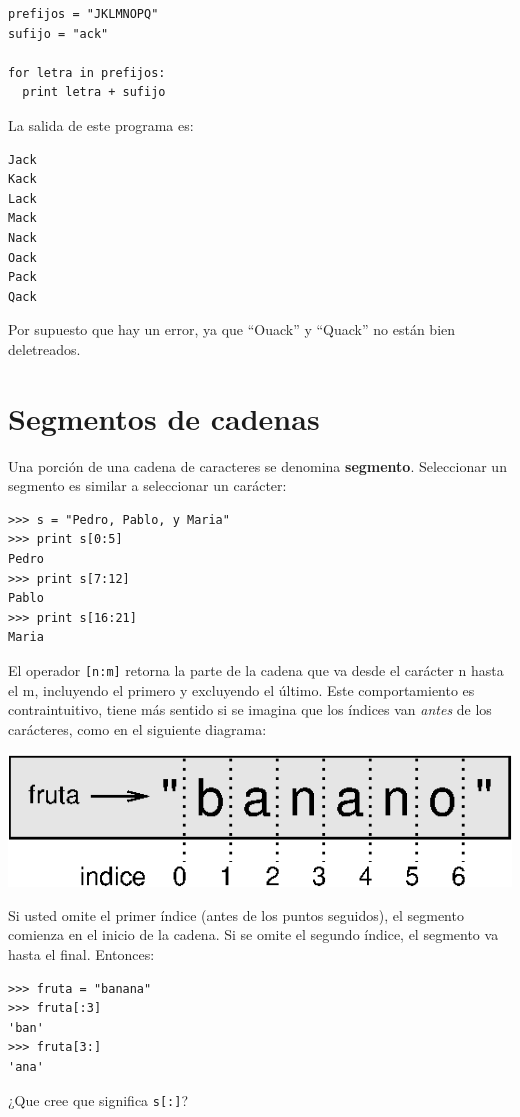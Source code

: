 \beforeverb
\begin{verbatim}
prefijos = "JKLMNOPQ"
sufijo = "ack"

for letra in prefijos:
  print letra + sufijo
\end{verbatim}
\afterverb
%
La salida de este programa es:

\beforeverb
\begin{verbatim}
Jack
Kack
Lack
Mack
Nack
Oack
Pack
Qack
\end{verbatim}
\afterverb
%
Por supuesto que hay un error, ya que ``Ouack'' y
``Quack'' no están bien deletreados.


\section{Segmentos de cadenas }
\label{slice}

Una porción de una cadena de caracteres se denomina {\bf segmento}.  
Seleccionar un segmento es similar a seleccionar un carácter:

\beforeverb
\begin{verbatim}
>>> s = "Pedro, Pablo, y Maria"
>>> print s[0:5]
Pedro
>>> print s[7:12]
Pablo
>>> print s[16:21]
Maria
\end{verbatim}
\afterverb
%
El operador \texttt{[n:m]} retorna la parte de la cadena
que va desde el carácter n hasta el m, incluyendo el 
primero y excluyendo el último. Este comportamiento
es contraintuitivo, tiene más sentido si se imagina
que los índices van {\em antes} de los
carácteres, como en el siguiente diagrama:

\beforefig
\centerline{\includegraphics{illustrations/banana.eps}}
\afterfig

Si usted omite el primer índice (antes de los puntos seguidos), el
segmento comienza en el inicio de la cadena. Si se omite el segundo
índice, el segmento va hasta el final. Entonces:

\beforeverb
\begin{verbatim}
>>> fruta = "banana"
>>> fruta[:3]
'ban'
>>> fruta[3:]
'ana'
\end{verbatim}
\afterverb
%
¿Que cree que significa \texttt{s[:]}?


